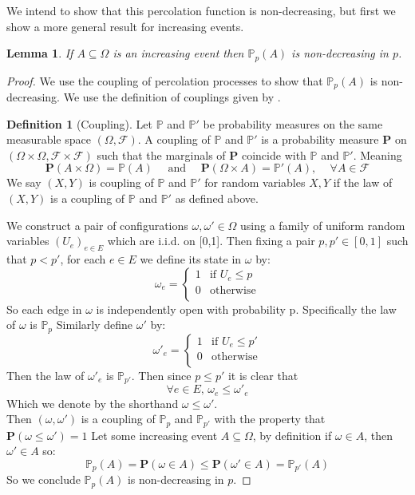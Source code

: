 \documentclass[a4paper,11pt]{article}
\newtheorem{lemma}[theorem]{Lemma}
\theoremstyle{definition}
\newtheorem{definition}[theorem]{Definition}
\newcommand{\prob}{\mathbb{P}_p}
\begin{document}
We intend to show that this percolation function is non-decreasing, but first we show a more general result for increasing events.

\begin{lemma} \label{incEventlemma}
	If $A \subseteq \Omega$ is an increasing event then $\prob(A)$ is non-decreasing in $p$. 
\end{lemma}

\begin{proof}
	We use the coupling of percolation processes to show that $\prob(A)$ is non-decreasing. We use the definition of couplings given by \cite{roch2015modern}.

	\begin{definition}[Coupling]
		Let $\mathbb{P}$ and $\mathbb{P}'$ be probability measures on the same measurable space $(\Omega,\mathcal{F})$.
		A coupling of $\mathbb{P}$ and $\mathbb{P}'$ is a probability measure $\mathbf{P}$ on $(\Omega\times\Omega,\mathcal{F}\times \mathcal{F})$ such that the marginals of $\mathbf{P}$ coincide with $\mathbb{P}$ and $\mathbb{P}'$.
		Meaning 
		$$\mathbf{P}(A \times \Omega) = \mathbb{P}(A) \quad \text{  and  } \quad \mathbf{P}(\Omega \times A) = \mathbb{P}'(A) \text{, }\quad \forall A \in \mathcal{F}$$
		We say $(X,Y)$ is coupling of $\mathbb{P}$ and $\mathbb{P}'$ for random variables $X,Y$ if the law of $(X,Y)$ is a coupling of $\mathbb{P}$ and $\mathbb{P}'$ as defined above.
	
	\end{definition}

	We construct a pair of configurations $\omega, \omega' \in \Omega$ using a family of uniform random variables $(U_e)_{e\in E}$ which are i.i.d. on [0,1].
	Then fixing a pair $p,p' \in [0,1]$ such that $p < p'$, for each $e \in E$ we define its state in $\omega$ by:
	$$\omega_e = \begin{cases}
		1 & \text{if }U_e \leq p\\
		0 & \text{otherwise}\\
	\end{cases} $$
	So each edge in $\omega$ is independently open with probability p. Specifically the law of $\omega$ is $\prob$ 
	  Similarly define $\omega'$ by:
	$$\omega'_e = \begin{cases}
		1 & \text{if }U_e \leq p'\\
		0 & \text{otherwise}\\
	\end{cases} $$
	Then the law of $\omega'_e$ is $\mathbb{P}_{p'}$. Then since $p \leq p'$ it is clear that
	$$\forall e \in E \text{, }\omega_e \leq \omega'_e $$
	Which we denote by the shorthand $\omega \leq \omega'$.\\
	Then $(\omega,\omega')$ is a coupling of $\mathbb{P}_{p}$ and $\mathbb{P}_{p'}$ with the property that $\mathbf{P}(\omega \leq \omega') = 1$
	Let some increasing event $A \subseteq \Omega$, by definition if $\omega \in A$, then $\omega' \in A$ so:
	$$\mathbb{P}_p(A) = \mathbf{P}(\omega \in A) \leq \mathbf{P}(\omega' \in A) = \mathbb{P}_{p'}(A)$$
	So we conclude $\prob(A)$ is non-decreasing in $p$.

\end{proof}
\end{document}
